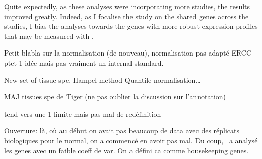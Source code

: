 Quite expectedly, as these analyses were incorporating more studies,
the results improved greatly.
Indeed, as I focalise the study on the shared genes across the studies,
I bias the analyses towards the genes with more robust expression profiles
that may be measured with \Rnaseq.




Petit blabla sur la normalisation (de nouveau), normalisation pas adapté
ERCC ptet 1 idée mais pas vraiment un internal standard.


New set of tissue spe.
Hampel method
Quantile normalisation\ldots

MAJ tissues spe de Tiger (ne pas oublier la discussion sur l'annotation)

tend vers une 1 limite mais pas mal de redéfinition



Ouverture: là, où au début on avait pas beaucoup de data avec des réplicats
biologiques pour le normal, on a commencé en avoir pas mal. Du coup, \nuno\
a analysé les genes avec un faible coeff de var. On a défini ca comme housekeeping
genes.


\begin{comment}
  \begin{figure}%
      \includegraphics%
      {transcriptomics/}\centering
      \caption[]
      {\label{fig:}\textbf{}}
  \end{figure}
\end{comment}








